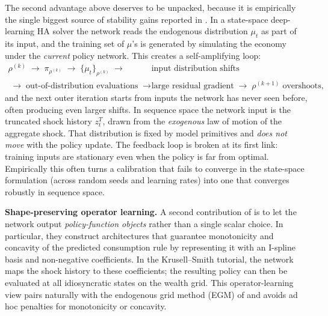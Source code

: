 \documentclass[11pt,a4paper]{report}
\begin{document}
\begin{keyinsightbox}
\small
The second advantage above deserves to be unpacked, because it is empirically the single biggest source of stability gains reported in \citet{azinovicyangzemlicka2025sequencespace}.  In a state-space deep-learning HA solver the network reads the endogenous distribution $\mu_t$ as part of its input, and the training set of $\mu$'s is generated by simulating the economy under the \emph{current} policy network.  This creates a self-amplifying loop:
\[
\begin{aligned}
\rho^{(k)} \;\longrightarrow\; \pi_{\rho^{(k)}} \;\longrightarrow\; \{\mu_t\}_{\rho^{(k)}} \;\longrightarrow\;& \text{input distribution shifts}\\[-2pt]
\;\longrightarrow\; \text{out-of-distribution evaluations} \;\longrightarrow\;& \text{large residual gradient} \;\longrightarrow\; \rho^{(k+1)}\;\text{overshoots},
\end{aligned}
\]
and the next outer iteration starts from inputs the network has never seen before, often producing even larger shifts.  In sequence space the network input is the truncated shock history $z_t^T$, drawn from the \emph{exogenous} law of motion of the aggregate shock.  That distribution is fixed by model primitives and \emph{does not move} with the policy update.  The feedback loop is broken at its first link: training inputs are stationary even when the policy is far from optimal.  Empirically this often turns a calibration that fails to converge in the state-space formulation (across random seeds and learning rates) into one that converges robustly in sequence space.
\end{keyinsightbox}

\medskip\noindent\textbf{Shape-preserving operator learning.}
A second contribution of \citet{azinovicyangzemlicka2025sequencespace} is to let the network output \emph{policy-function objects} rather than a single scalar choice.  In particular, they construct architectures that guarantee monotonicity and concavity of the predicted consumption rule by representing it with an I-spline basis and non-negative coefficients.  In the Krusell--Smith tutorial, the network maps the shock history to these coefficients; the resulting policy can then be evaluated at all idiosyncratic states on the wealth grid.  This operator-learning view pairs naturally with the endogenous grid method (EGM) of \citet{carroll2006method} and avoids ad hoc penalties for monotonicity or concavity.
\end{document}
